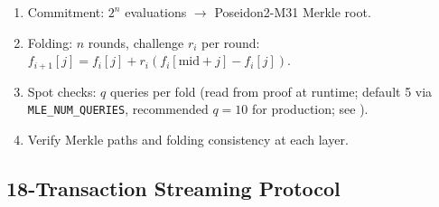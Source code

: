 \documentclass[10pt,twocolumn]{article}
\theoremstyle{definition}
\theoremstyle{remark}
\begin{document}
\begin{enumerate}[nosep,leftmargin=1.4em]
  \item Commitment: $2^n$ evaluations $\to$ Poseidon2-M31 Merkle root.
  \item Folding: $n$ rounds, challenge $r_i$ per round:
    $f_{i+1}[j] = f_i[j] + r_i(f_i[\mathrm{mid}+j]-f_i[j])$.
  \item Spot checks: $q$ queries per fold (read from
    proof at runtime; default 5 via \texttt{MLE\_NUM\_QUERIES},
    recommended $q=10$ for production; see ).
  \item Verify Merkle paths and folding consistency at each layer.
\end{enumerate}

\subsection{18-Transaction Streaming Protocol}
\end{document}
